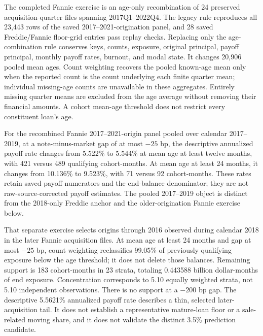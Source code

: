 The completed Fannie exercise is an age-only recombination of 24 preserved acquisition-quarter files spanning 2017Q1--2022Q4. The legacy rule reproduces all 23,443 rows of the saved 2017--2021-origination panel, and 28 saved Freddie/Fannie floor-grid entries pass replay checks. Replacing only the age-combination rule conserves keys, counts, exposure, original principal, payoff principal, monthly payoff rates, burnout, and modal state. It changes 20,906 pooled mean ages. Count weighting recovers the pooled known-age mean only when the reported count is the count underlying each finite quarter mean; individual missing-age counts are unavailable in these aggregates. Entirely missing quarter means are excluded from the age average without removing their financial amounts. A cohort mean-age threshold does not restrict every constituent loan's age.

For the recombined Fannie 2017--2021-origin panel pooled over calendar 2017--2019, at a note-minus-market gap of at most $-25$ bp, the descriptive annualized payoff rate changes from 5.522\% to 5.544\% at mean age at least twelve months, with 421 versus 489 qualifying cohort-months. At mean age at least 24 months, it changes from 10.136\% to 9.523\%, with 71 versus 92 cohort-months. These rates retain saved payoff numerators and the end-balance denominator; they are not raw-source-corrected payoff estimates. The pooled 2017--2019 object is distinct from the 2018-only Freddie anchor and the older-origination Fannie exercise below.

That separate exercise selects origins through 2016 observed during calendar 2018 in the later Fannie acquisition files. At mean age at least 24 months and gap at most $-25$ bp, count weighting reclassifies 99.05\% of previously qualifying exposure below the age threshold; it does not delete those balances. Remaining support is 183 cohort-months in 23 strata, totaling 0.443588 billion dollar-months of end exposure. Concentration corresponds to 5.10 equally weighted strata, not 5.10 independent observations. There is no support at a $-200$ bp gap. The descriptive 5.5621\% annualized payoff rate describes a thin, selected later-acquisition tail. It does not establish a representative mature-loan floor or a sale-related moving share, and it does not validate the distinct 3.5\% prediction candidate.

